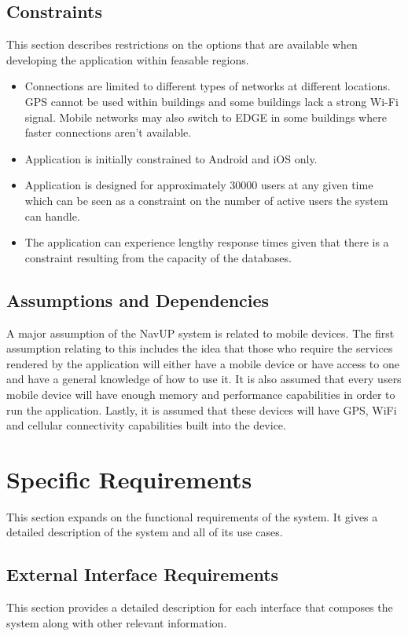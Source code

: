 \documentclass{article}
\begin{document}
	\subsection{Constraints}
	This section describes restrictions on the options that are available when developing the application within feasable regions.
		\begin{itemize}
			\item Connections are limited to different types of networks at different locations. GPS cannot be used within buildings and some buildings lack a strong Wi-Fi signal. Mobile networks may also switch to EDGE in some buildings where faster connections aren't available.
			\item Application is initially constrained to Android and iOS only.
			\item Application is designed for approximately 30000 users at any given time which can be seen as a constraint on the number of active users the system can handle.
			\item The application can experience lengthy response times given that there is a constraint resulting from the capacity of the databases.\newline
		\end{itemize}
	
	\subsection{Assumptions and Dependencies}
		A major assumption of the NavUP system is related to mobile devices. The first assumption relating to this includes the idea that those who require the services rendered by the application will either have a mobile device or have access to one and have a general knowledge of how to use it. It is also assumed that every users mobile device will have enough memory and performance capabilities in order to run the application. Lastly, it is assumed that these devices will have GPS, WiFi and cellular connectivity capabilities built into the device.
	
	\section{Specific Requirements}
	This section expands on the functional requirements of the system. It gives a detailed 	description of the system and all of its use cases.
	
	\subsection{External Interface Requirements}
	This section provides a detailed description for each interface that composes the system along with other relevant information.
\end{document}
